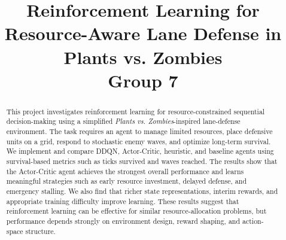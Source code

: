 \documentclass[conference,onecolumn]{IEEEtran}
\begin{document}
\title{Reinforcement Learning for Resource-Aware Lane Defense in Plants vs. Zombies\\

\large Group 7}

\author{
\and
{}
\and
{}
}

\maketitle

\begin{abstract}
This project investigates reinforcement learning for resource-constrained sequential decision-making using a simplified \textit{Plants vs. Zombies}-inspired lane-defense environment. The task requires an agent to manage limited resources, place defensive units on a grid, respond to stochastic enemy waves, and optimize long-term survival. We implement and compare DDQN, Actor-Critic, heuristic, and baseline agents using survival-based metrics such as ticks survived and waves reached. The results show that the Actor-Critic agent achieves the strongest overall performance and learns meaningful strategies such as early resource investment, delayed defense, and emergency stalling. We also find that richer state representations, interim rewards, and appropriate training difficulty improve learning. These results suggest that reinforcement learning can be effective for similar resource-allocation problems, but performance depends strongly on environment design, reward shaping, and action-space structure.
\end{abstract}
\end{document}
